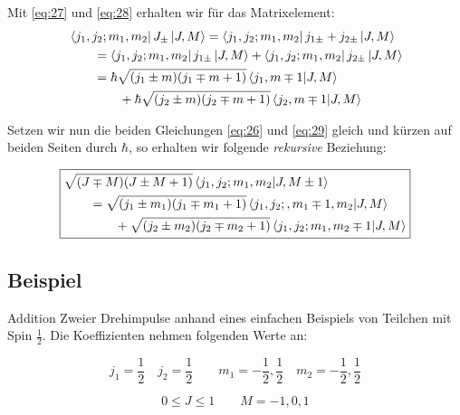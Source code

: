 Mit \eqref{eq:27} und \eqref{eq:28} erhalten wir für das Matrixelement:
\begin{align}
  \label{eq:29}
  &\bra{j_1,j_2;m_1,m_2}J_{\pm}\ket{J,M}=\bra{j_1,j_2;m_1,m_2}j_{1\pm}+j_{2\pm}
  \ket{J,M}\notag\\
  &\qquad
  =\bra{j_1,j_2;m_1,m_2}j_{1\pm}\ket{J,M}+\bra{j_1,j_2;m_1,m_2}j_{2\pm}
  \ket{J,M}\notag\\
  &\qquad
  =\hbar\sqrt{(j_1\pm m)(j_1\mp m+1)}
   \braket{j_1,m\mp 1}{J,M}\notag\\
   &\qquad\qquad
   +\hbar\sqrt{(j_2\pm m)(j_2\mp m+1)}
   \braket{j_2,m\mp 1}{J,M}\notag\\
\end{align}

Setzen wir nun die beiden Gleichungen \eqref{eq:26} und \eqref{eq:29} gleich und
kürzen auf beiden Seiten durch \(\hbar\), so erhalten wir folgende
\emph{rekursive} Beziehung:

\begin{equation}
  \label{eq:30}
  \boxed{
    \begin{split}
      &\sqrt{(J\mp M)
        (J\pm M+1)}\braket{j_1,j_2;m_1,m_2}{J,M\pm 1}\\
      &\qquad
      = \sqrt{(j_1\pm m_1)(j_1\mp m_1+1)}
      \braket{j_1,j_2;,m_1\mp 1,m_2}{J,M}\\
      &\qquad\qquad
      +\sqrt{(j_2\pm m_2)(j_2\mp m_2+1)}
      \braket{j_1,j_2;m_1,m_2\mp 1}{J,M}
    \end{split}}
\end{equation}





\subsection*{Beispiel}

Addition Zweier Drehimpulse anhand eines einfachen Beispiels von Teilchen mit Spin \(\frac{1}{2}\). Die Koeffizienten nehmen folgenden Werte an:

\begin{equation}
  \label{eq:31}
  j_1 = \frac{1}{2}\quad j_2 = \frac{1}{2}\qquad m_1 = -\frac{1}{2},\frac{1}{2}\quad m_2=-\frac{1}{2},\frac{1}{2}
\end{equation}

\begin{equation}
  \label{eq:32}
  0 \leq J \leq 1\qquad M = -1,0,1
\end{equation}


